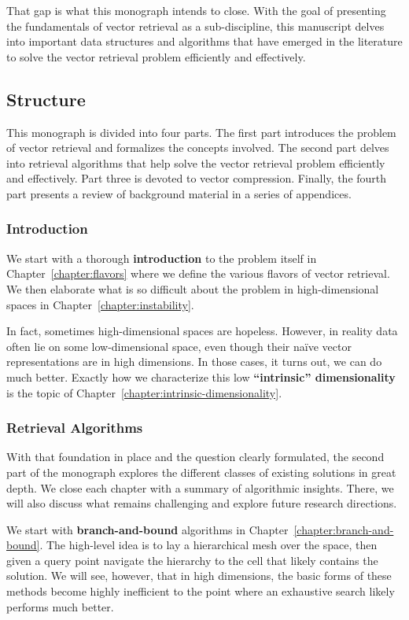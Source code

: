 That gap is what this monograph intends to close.
With the goal of presenting the fundamentals of vector retrieval as a sub-discipline,
this manuscript delves into important data structures and algorithms that have
emerged in the literature to solve the vector retrieval problem efficiently and effectively.

\subsection*{Structure}
This monograph is divided into four parts. The first part introduces the problem
of vector retrieval and formalizes the concepts involved. The second part delves into
retrieval algorithms that help solve the vector retrieval problem efficiently and effectively.
Part three is devoted to vector compression. Finally, the fourth part presents a review
of background material in a series of appendices.

\subsubsection*{Introduction}
We start with a thorough \textbf{introduction} to the problem itself in Chapter~\ref{chapter:flavors}
where we define the various flavors of vector retrieval.
We then elaborate what is so difficult about the problem in high-dimensional spaces
in Chapter~\ref{chapter:instability}.

In fact, sometimes high-dimensional spaces are hopeless. However, in reality data often
lie on some low-dimensional space, even though their na\"ive vector representations
are in high dimensions. In those cases, it turns out, we can do much better. Exactly how
we characterize this low \textbf{``intrinsic'' dimensionality} is the topic of
Chapter~\ref{chapter:intrinsic-dimensionality}.

\subsubsection*{Retrieval Algorithms}
With that foundation in place and the question clearly formulated,
the second part of the monograph explores the different classes of existing solutions
in great depth.
We close each chapter with a summary of algorithmic insights.
There, we will also discuss what remains challenging and explore future research directions.

We start with \textbf{branch-and-bound} algorithms in Chapter~\ref{chapter:branch-and-bound}.
The high-level idea is to lay a hierarchical mesh over the space, then given a query point
navigate the hierarchy to the cell that likely contains the solution.
We will see, however, that in high dimensions, the basic forms of these methods become highly inefficient
to the point where an exhaustive search likely performs much better.

